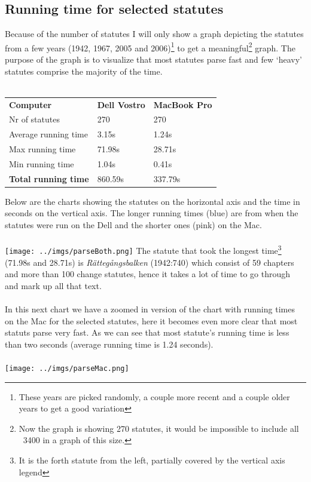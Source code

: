 \subsection{Running time for selected statutes}
Because of the number of statutes I will only show a graph depicting the statutes from a few years (1942, 1967, 2005 and 2006)\footnote{These years are picked randomly, a couple more recent and a couple older years to get a good variation} to get a meaningful\footnote{Now the graph is showing 270 statutes, it would be impossible to include all ~3400 in a graph of this size.} graph. The purpose of the graph is to visualize that most statutes parse fast and few ‘heavy’ statutes comprise the majority of the time.\\\\
\begin{tabular}{l l l}
\textbf{Computer} & \textbf{Dell Vostro} & \textbf{MacBook Pro}\\
Nr of statutes & 270 & 270\\
Average running time	& 3.15s & 1.24s\\
Max running time &  71.98s & 28.71s\\
Min running time & 1.04s & 0.41s\\
\textbf{Total running time} & 860.59s & 337.79s\\
\end{tabular}
\linebreak
\newline
Below are the charts showing the statutes on the horizontal axis and the time in seconds on the vertical axis. The longer running times (blue) are from when the statutes were run on the Dell and the shorter ones (pink) on the Mac.\\\\ 
\texttt{[image: ../imgs/parseBoth.png]}
\pagebreak
The statute that took the longest time\footnote{It is the forth statute from the left, partially covered by the vertical axis legend} (71.98s and 28.71s) is \textit{Rättegångsbalken} (1942:740) which consist of 59 chapters and more than 100 change statutes, hence it takes a lot of time to go through and mark up all that text.\\\\
In this next chart we have a zoomed in version of the chart with running times on the Mac for the selected statutes, here it becomes even more clear that most statuts parse very fast. As we can see that most statute's running time is less than two seconds (average running time is 1.24 seconds).\\\\
\texttt{[image: ../imgs/parseMac.png]}

